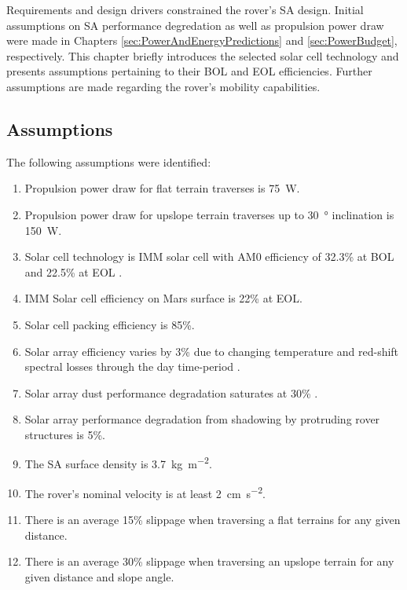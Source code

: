 Requirements and design drivers constrained the rover's \ac{SA} design. Initial assumptions on \ac{SA} performance degredation as well as propulsion power draw were made in Chapters \ref{sec:PowerAndEnergyPredictions} and \ref{sec:PowerBudget}, respectively. This chapter briefly introduces the selected solar cell technology and presents assumptions pertaining to their \ac{BOL} and \ac{EOL} efficiencies. Further assumptions are made regarding the rover's mobility capabilities.


\subsection{Assumptions}
\label{sec:RequirementsAndDesignDrivers:Assumptions}
The following assumptions were identified:

\begin{enumerate}[label=\textbf{\textcolor{BulletBlue}{A-\arabic*}}]
    \item Propulsion power draw for flat terrain traverses is \SI{75}{\watt}.
    \item Propulsion power draw for upslope terrain traverses up to \SI{30}{\degree} inclination is \SI{150}{\watt}.
    \item Solar cell technology is \ac{IMM} solar cell with AM0 efficiency of 32.3\% at \ac{BOL} and 22.5\% at \ac{EOL} .
    \item \label{itm:ass:solar_cell_efficiency} \ac{IMM} Solar cell efficiency on Mars surface is 22\% at \ac{EOL}.
    \item \label{itm:ass:packing_efficiency} Solar cell packing efficiency is 85\%.
    \item \label{itm:ass:red_shifts} Solar array efficiency varies by 3\% due to changing temperature and red-shift spectral losses through the day time-period .
    \item \label{itm:ass:dust_deposition_saturation} Solar array dust performance degradation saturates at 30\% .
    \item \label{itm:ass:protruding_shadowing} Solar array performance degradation from shadowing by protruding rover structures is 5\%.
    \item The \ac{SA} surface density is \SI{3.7}{kg.m^{-2}}.
    \item The rover's nominal velocity is at least \SI{2}{cm.s^{-2}}.
    \item There is an average 15\% slippage when traversing a flat terrains for any given distance.
    \item There is an average 30\% slippage when traversing an upslope terrain for any given distance and slope angle.
\end{enumerate}

